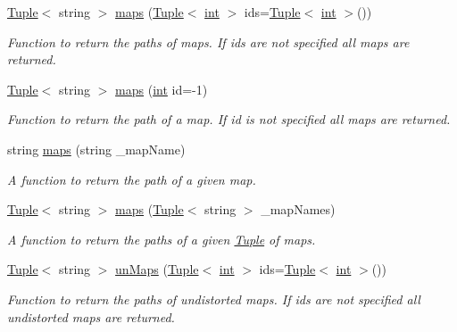 \begin{DoxyCompactItemize}
\mbox{\hyperlink{class_tuple}{Tuple}}$<$ string $>$ \mbox{\hyperlink{class_settings_aa924e455cc6ac356ba6a4c59ab09591c}{maps}} (\mbox{\hyperlink{class_tuple}{Tuple}}$<$ \mbox{\hyperlink{draw_8hh_aa620a13339ac3a1177c86edc549fda9b}{int}} $>$ ids=\mbox{\hyperlink{class_tuple}{Tuple}}$<$ \mbox{\hyperlink{draw_8hh_aa620a13339ac3a1177c86edc549fda9b}{int}} $>$())
\begin{DoxyCompactList}\small\item\em Function to return the paths of maps. If ids are not specified all maps are returned. \end{DoxyCompactList}\item 
\mbox{\hyperlink{class_tuple}{Tuple}}$<$ string $>$ \mbox{\hyperlink{class_settings_adc050f187f4040f5e897b2ff41caedd0}{maps}} (\mbox{\hyperlink{draw_8hh_aa620a13339ac3a1177c86edc549fda9b}{int}} id=-\/1)
\begin{DoxyCompactList}\small\item\em Function to return the path of a map. If id is not specified all maps are returned. \end{DoxyCompactList}\item 
string \mbox{\hyperlink{class_settings_aa34e6004beffad1bc5fd81f99353d3e1}{maps}} (string \+\_\+map\+Name)
\begin{DoxyCompactList}\small\item\em A function to return the path of a given map. \end{DoxyCompactList}\item 
\mbox{\hyperlink{class_tuple}{Tuple}}$<$ string $>$ \mbox{\hyperlink{class_settings_ab638c9895f57ed5e8ab64084752c660d}{maps}} (\mbox{\hyperlink{class_tuple}{Tuple}}$<$ string $>$ \+\_\+map\+Names)
\begin{DoxyCompactList}\small\item\em A function to return the paths of a given \mbox{\hyperlink{class_tuple}{Tuple}} of maps. \end{DoxyCompactList}\item 
\mbox{\hyperlink{class_tuple}{Tuple}}$<$ string $>$ \mbox{\hyperlink{class_settings_a7cbf0234eaca6582ce982f0cf756d282}{un\+Maps}} (\mbox{\hyperlink{class_tuple}{Tuple}}$<$ \mbox{\hyperlink{draw_8hh_aa620a13339ac3a1177c86edc549fda9b}{int}} $>$ ids=\mbox{\hyperlink{class_tuple}{Tuple}}$<$ \mbox{\hyperlink{draw_8hh_aa620a13339ac3a1177c86edc549fda9b}{int}} $>$())
\begin{DoxyCompactList}\small\item\em Function to return the paths of undistorted maps. If ids are not specified all undistorted maps are returned. \end{DoxyCompactList}\item 

\end{DoxyCompactItemize}
